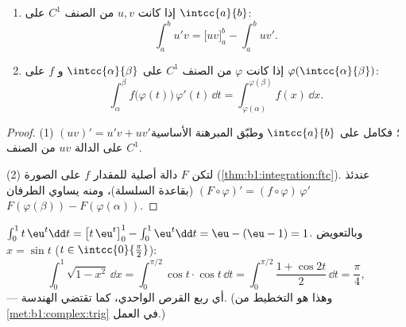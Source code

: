 \begin{theorem}\label{thm:b1:integration:parts}
\begin{enumerate}
  \item إذا كانت $u, v$ من الصنف $C^1$ على $\intcc{a}{b}$:
        \[
        \int_a^b u'v = \bigl[uv\bigr]_a^b - \int_a^b uv' .
        \]
  \item إذا كانت $\varphi$ من الصنف $C^1$ على $\intcc{\alpha}{\beta}$ و $f$
         على $\varphi(\intcc{\alpha}{\beta})$:
        \[
        \int_{\alpha}^{\beta} f\bigl(\varphi(t)\bigr)\,\varphi'(t)\,
        \dd t = \int_{\varphi(\alpha)}^{\varphi(\beta)} f(x)\, \dd x .
        \]
\end{enumerate}
\end{theorem}

\begin{proof}
(1) $(uv)' = u'v + uv'$؛ فكامل على $\intcc{a}{b}$ وطبّق
المبرهنة الأساسية على الدالة $uv$ من الصنف $C^1$.

(2) لتكن $F$ دالة أصلية للمقدار $f$ على  الصورة
(\cref{thm:b1:integration:ftc}). عندئذ $(F \circ \varphi)' = (f
\circ \varphi)\,\varphi'$ (بقاعدة السلسلة)، ومنه يساوي الطرفان
$F(\varphi(\beta)) - F(\varphi(\alpha))$.
\end{proof}

\begin{example}\label{ex:b1:integration:parts}
$\int_0^1 t\,\eu^t \dd t = \bigl[t\,\eu^t\bigr]_0^1 - \int_0^1
\eu^t\dd t = \eu - (\eu - 1) = 1$. وبالتعويض $x =
\sin t$ ($t \in \intcc{0}{\frac\pi2}$):
\[
\int_0^1 \sqrt{1 - x^2}\, \dd x
= \int_0^{\pi/2} \cos t \cdot \cos t \, \dd t
= \int_0^{\pi/2} \frac{1 + \cos 2t}{2}\, \dd t = \frac\pi4 ,
\]
--- أي ربع القرص الواحدي، كما تقتضي الهندسة. (وهذا هو التخطيط
من \cref{met:b1:complex:trig} في العمل.)
\end{example}

